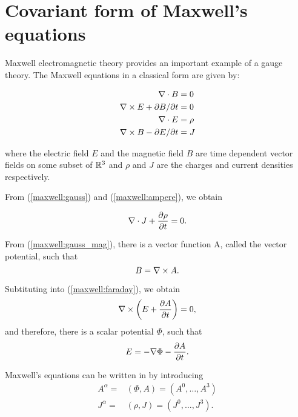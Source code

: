 \section{Covariant form of Maxwell's equations}

Maxwell electromagnetic theory provides an important example of a gauge theory.  The Maxwell equations in a classical form are given by:

\begin{align}
\label{maxwell:gauss_mag}
\nabla \cdot B&=0\\
\label{maxwell:faraday}
\nabla \times E +\partial B / \partial t &= 0 \\
\label{maxwell:gauss}
\nabla \cdot E &= \rho\\
\label{maxwell:ampere}
\nabla \times B  - \partial E / \partial t  &= J
\end{align}

where the electric field $E$ and the magnetic field $B$ are time dependent vector fields on some subset of $\mathbb R^{3}$ and $\rho$ and $J$ are the charges and current densities respectively.

From (\ref{maxwell:gauss}) and (\ref{maxwell:ampere}), we obtain 

\begin{equation}
\label{maxwell:continuity_eq}
\nabla \cdot J + \frac{\partial \rho}{\partial t}=0.
\end{equation}

From (\ref{maxwell:gauss_mag}), there is a vector function A, called the vector potential, such that
\begin{equation}
\label{SA:1.21}
B=\nabla \times A.
\end{equation}

Subtituting into (\ref{maxwell:faraday}), we obtain
\begin{equation}
\label{SA:1.22}
\nabla \times \left( E+\frac{\partial A}{\partial t} \right)=0,
\end{equation}
and therefore, there is a scalar potential $\Phi$, such that
\begin{equation}
\label{SA:1.23}
E=-\nabla \Phi - \frac{\partial A}{\partial t}.
\end{equation}

Maxwell's equations can be written in  by introducing 
\begin{align}
\label{SA:1.24}
A^{\alpha}=&(\Phi, A)=(A^{0}, \dots, A^{3})\\
\label{SA:1.25}
J^{\alpha}=&(\rho, J)=(J^{0}, \dots, J^{3}).
\end{align}

